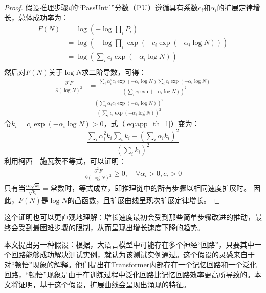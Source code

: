     
\begin{proof}
    假设推理步骤\(i\)的“PassUntil”分数（\(\textsc{PU}\)）遵循具有系数\(c_i\)和\(\alpha_i\)的扩展定律增长，总体成功率为：
    \begin{equation}
    \begin{split}
     F(N) & = \operatorname{log}\left(-\operatorname{log}\prod_i P_i\right)\\ & = \operatorname{log}\left(-\operatorname{log} \prod_i\operatorname{exp}\left(- c_i \operatorname{exp}(-\alpha_i \operatorname{log} N)\right)\right) \\ & = \operatorname{log}\left(\sum_i c_i \operatorname{exp}\left(-\alpha_i \operatorname{log} N \right)\right)\\
    \end{split}
    \end{equation}
    然后对\(F(N)\)关于\(\log N\)求二阶导数，可得：
    \begin{equation}
    \label{eq:app_th_1}
    \begin{split}
        \frac{\partial^2{F}}{\partial{(\operatorname{log}N )^2}} & = \frac{\sum_i \alpha_i^2 c_i \exp(-\alpha_i \log N) \sum_i c_i \exp(-\alpha_i \log N)}{(\sum_i c_i\exp(-\alpha_i \log N))^2} \\
    & - \frac{(\sum_i \alpha_i c_i \exp(-\alpha_i \log N) )^2}{(\sum_i c_i\exp(-\alpha_i \log N))^2}
    \end{split}
    \end{equation}
    令\(k_i = c_i \exp(-\alpha_i \log N) > 0\)，式（\ref{eq:app_th_1}）变为：
    \begin{equation}
    \frac{\sum_i \alpha_i^2 k_i\sum_i k_i - (\sum_i \alpha_i k_i)^2}{(\sum_i k_i)^2}
    \end{equation}
    利用柯西 - 施瓦茨不等式，可以证明：
    \begin{align}
    \frac{\partial^2{F}}{\partial{(\operatorname{log}N )^2}} \geq 0, \quad \forall  \alpha_i > 0, c_i > 0
    \end{align}
    只有当\(\frac{\alpha_i \sqrt{k_i}}{\sqrt{k_i}} = \text{常数}\)时，等式成立，即推理链中的所有步骤以相同速度扩展时。
    因此，\(F(N)\)是\(\operatorname{log}N\)的凸函数，且扩展曲线呈现次扩展定律增长。 
\end{proof}


这个证明也可以更直观地理解：增长速度最初会受到那些简单步骤改进的推动，最终会受到最困难步骤的限制，从而呈现出增长速度下降的趋势。

本文提出另一种假设：根据\citet{elhage2021mathematical}，大语言模型中可能存在多个神经“回路”，只要其中一个回路能够成功解决测试实例，就认为该测试实例通过。这个假设的灵感来自于\citet{varma2023explaining}对“顿悟”现象的解释。他们提出在Transformer内部存在一个记忆回路和一个泛化回路，“顿悟”现象是由于在训练过程中泛化回路比记忆回路效率更高所导致的。本文将证明，基于这个假设，扩展曲线会呈现出涌现的特征。

